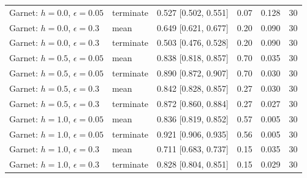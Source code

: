 \begin{tabular}{llrrrr}
Garnet: $h{=}0.0$, $\epsilon{=}0.05$ & terminate & 0.527 [0.502, 0.551] & 0.07 & 0.128 & 30 \\
Garnet: $h{=}0.0$, $\epsilon{=}0.3$ & mean & 0.649 [0.621, 0.677] & 0.20 & 0.090 & 30 \\
Garnet: $h{=}0.0$, $\epsilon{=}0.3$ & terminate & 0.503 [0.476, 0.528] & 0.20 & 0.090 & 30 \\
Garnet: $h{=}0.5$, $\epsilon{=}0.05$ & mean & 0.838 [0.818, 0.857] & 0.70 & 0.035 & 30 \\
Garnet: $h{=}0.5$, $\epsilon{=}0.05$ & terminate & 0.890 [0.872, 0.907] & 0.70 & 0.030 & 30 \\
Garnet: $h{=}0.5$, $\epsilon{=}0.3$ & mean & 0.842 [0.828, 0.857] & 0.27 & 0.030 & 30 \\
Garnet: $h{=}0.5$, $\epsilon{=}0.3$ & terminate & 0.872 [0.860, 0.884] & 0.27 & 0.027 & 30 \\
Garnet: $h{=}1.0$, $\epsilon{=}0.05$ & mean & 0.836 [0.819, 0.852] & 0.57 & 0.005 & 30 \\
Garnet: $h{=}1.0$, $\epsilon{=}0.05$ & terminate & 0.921 [0.906, 0.935] & 0.56 & 0.005 & 30 \\
Garnet: $h{=}1.0$, $\epsilon{=}0.3$ & mean & 0.711 [0.683, 0.737] & 0.15 & 0.035 & 30 \\
Garnet: $h{=}1.0$, $\epsilon{=}0.3$ & terminate & 0.828 [0.804, 0.851] & 0.15 & 0.029 & 30 \\
\bottomrule
\end{tabular}
